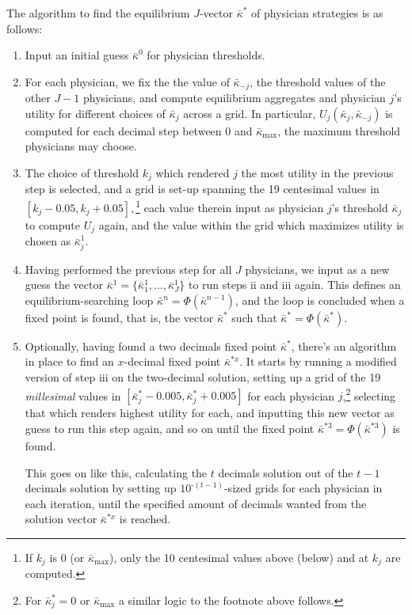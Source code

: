 \documentclass[../main.tex]{subfiles}
\begin{document}
The algorithm to find the equilibrium $J$-vector $\bar{\kappa}^*$ of physician strategies is as follows:
\begin{enumerate}[label=\roman*, itemsep=0pt, topsep=0pt]
    \item Input an initial guess $\bar{\kappa}^0$ for physician thresholds.
    \item For each physician, we fix the the value of $\bar{\kappa}_{-j}$, the threshold values of the other $J-1$ physicians, and compute equilibrium aggregates and physician $j$'s utility for different choices of $\bar{\kappa}_{j}$ across a grid. In particular, $U_j(\bar{\kappa}_{j},\bar{\kappa}_{-j})$ is computed for each decimal step between 0 and $\bar{\kappa}_{\max}$, the maximum threshold physicians may choose.
    \item The choice of threshold $k_{j}$ which rendered $j$ the most utility in the previous step is selected, and a grid is set-up spanning the 19 centesimal values in $[k_j - 0.05, k_j + 0.05],$\footnote{If $k_j$ is 0 (or $\bar{\kappa}_{\max}$), only the 10 centesimal values above (below) and at $k_j$ are computed.} each value therein input as physician $j$'s threshold $\bar{\kappa}_{j}$ to compute $U_j$ again, and the value within the grid which maximizes utility is chosen as $\bar{\kappa}_j^1$.
    \item Having performed the previous step for all $J$ physicians, we input as a new guess the vector $\bar{\kappa}^1 = \{\bar{\kappa}_1^1,...,\bar{\kappa}_J^1\}$ to run steps ii and iii again. This defines an equilibrium-searching loop $\bar{\kappa}^{n} = \Phi(\bar{\kappa}^{n-1})$, and the loop is concluded when a fixed point is found, that is, the vector $\bar{\kappa}^*$ such that $\bar{\kappa}^{*} = \Phi(\bar{\kappa}^*)$.
    \item Optionally, having found a two decimals fixed point $\bar{\kappa}^*$, there's an algorithm in place to find an $x$-decimal fixed point $\bar{\kappa}^{*x}$. It starts by running a modified version of step iii on the two-decimal solution, setting up a grid of the 19 \textit{millesimal} values in $[\bar{\kappa}_j^{*} - 0.005, \bar{\kappa}_j^{*} + 0.005]$ for each physician $j$,\footnote{For $\bar{\kappa}_j^* = 0$ or $\bar{\kappa}_{\max}$ a similar logic to the footnote above follows.} selecting that which renders highest utility for each, and inputting this new vector as guess to run this step again, and so on until the fixed point $\bar{\kappa}^{* \scriptscriptstyle 3} = \Phi(\bar{\kappa}^{* \scriptscriptstyle 3})$ is found. 
    
    This goes on like this, calculating the $t$ decimals solution out of the $t-1$ decimals solution by setting up $10^{\text{-}(t-1)}$-sized grids for each physician in each iteration, until the specified amount of decimals wanted from the solution vector $\bar{\kappa}^{*x}$ is reached.
\end{enumerate}
\end{document}

